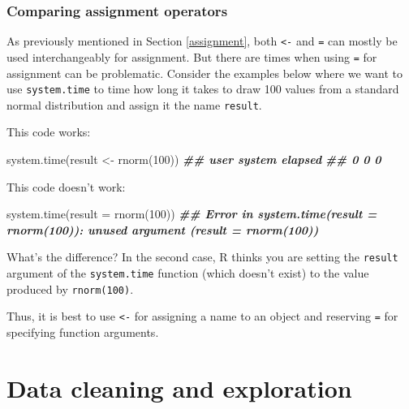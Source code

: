 \documentclass[
]{book}
\newenvironment{Shaded}{\begin{snugshade}}{\end{snugshade}}
\newcommand{\AttributeTok}[1]{\textcolor[rgb]{0.77,0.63,0.00}{#1}}
\newcommand{\DecValTok}[1]{\textcolor[rgb]{0.00,0.00,0.81}{#1}}
\newcommand{\DocumentationTok}[1]{\textcolor[rgb]{0.56,0.35,0.01}{\textbf{\textit{#1}}}}
\newcommand{\FunctionTok}[1]{\textcolor[rgb]{0.00,0.00,0.00}{#1}}
\newcommand{\NormalTok}[1]{#1}
\newcommand{\OtherTok}[1]{\textcolor[rgb]{0.56,0.35,0.01}{#1}}
\theoremstyle{definition}
\theoremstyle{definition}
\theoremstyle{definition}
\theoremstyle{definition}
\theoremstyle{remark}
\begin{document}
\hypertarget{comparing-assignment-operators}{%
\subsection{Comparing assignment operators}\label{comparing-assignment-operators}}

As previously mentioned in Section \ref{assignment}, both \texttt{\textless{}-} and \texttt{=} can mostly be used interchangeably for assignment. But there are times when using \texttt{=} for assignment can be problematic. Consider the examples below where we want to use \texttt{system.time} to time how long it takes to draw 100 values from a standard normal distribution and assign it the name \texttt{result}.

This code works:

\begin{Shaded}
\begin{Highlighting}[]
\FunctionTok{system.time}\NormalTok{(result }\OtherTok{\textless{}{-}} \FunctionTok{rnorm}\NormalTok{(}\DecValTok{100}\NormalTok{))}
\DocumentationTok{\#\#    user  system elapsed }
\DocumentationTok{\#\#       0       0       0}
\end{Highlighting}
\end{Shaded}

This code doesn't work:

\begin{Shaded}
\begin{Highlighting}[]
\FunctionTok{system.time}\NormalTok{(}\AttributeTok{result =} \FunctionTok{rnorm}\NormalTok{(}\DecValTok{100}\NormalTok{))}
\DocumentationTok{\#\# Error in system.time(result = rnorm(100)): unused argument (result = rnorm(100))}
\end{Highlighting}
\end{Shaded}

What's the difference? In the second case, R thinks you are setting the \texttt{result} argument of the \texttt{system.time} function (which doesn't exist) to the value produced by \texttt{rnorm(100)}.

Thus, it is best to use \texttt{\textless{}-} for assigning a name to an object and reserving \texttt{=} for specifying function arguments.

\hypertarget{data-cleaning-and-exploration}{%
\chapter{Data cleaning and exploration}\label{data-cleaning-and-exploration}}
\end{document}

